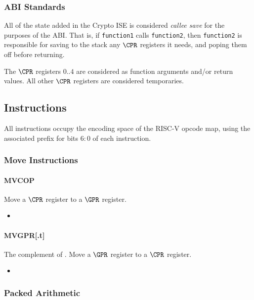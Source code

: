 \subsubsection{ABI Standards}

All of the state added in the Crypto ISE is considered {\em callee save}
for the purposes of the ABI. That is, if {\tt function1} calls 
{\tt function2}, then {\tt function2} is responsible for saving to the
stack any $\CPR$ registers it needs, and poping them off before returning.

The $\CPR$ registers $0..4$ are considered as function arguments
and/or return values. 
All other $\CPR$ registers are considered temporaries.

\subsection{Instructions}

All instructions occupy the \encspace encoding space of the RISC-V opcode
map, using the associated \encopcode prefix for bits $6:0$ of each 
instruction.

\subsubsection{Move Instructions}
\paragraph{MVCOP}

Move a $\CPR$ register to a $\GPR$ register.

\begin{itemize}
\item {}
\end{itemize}


\paragraph{MVGPR[.t]}

The complement of .
Move a $\GPR$ register to a $\CPR$ register.

\begin{itemize}
\item {}
\end{itemize}

\subsubsection{Packed Arithmetic}
